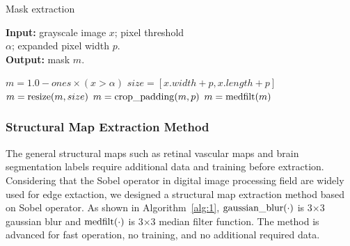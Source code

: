 \documentclass[runningheads]{llncs}
\begin{document}
	\vspace{-0.5cm}\begin{algorithm}[th]
		\caption{Mask extraction}
		\label{alg:2}
		\begin{multicols}{2}
			\hspace*{0.02in} {\bf Input: }grayscale image $x$; pixel threshold \\\hspace*{0.05in}$\alpha$; expanded pixel width $p$.\\
			\hspace*{0.02in} {\bf Output: }mask $m$.
			\begin{algorithmic}[1]
				\State $m = 1.0 - ones \times (x > \alpha)$
				\State $size=[x.width+p, x.length+p]$
				\State $m = {\rm resize}(m, size)$
				\State $m = {\rm crop\_padding}(m,p)$
				\State $m = {\rm medfilt}(m)$
			\end{algorithmic} 
		\end{multicols}
		\vspace{-0.3cm}
	\end{algorithm}\vspace{-0.75cm}
	\subsubsection{Structural Map Extraction Method}
	The general structural maps such as retinal vascular maps\cite{41costa2017towards} and brain segmentation labels \cite{4shin2018medical} require additional data and training before extraction. Considering that the Sobel operator\cite{147Sobel} in digital image processing field are widely used for edge extaction, we designed a structural map extraction method based on Sobel operator. As shown in Algorithm~\ref{alg:1}, ${\rm gaussian\_blur}(\cdot)$ is 3$\times$3 gaussian blur and ${\rm medfilt}(\cdot)$ is 3$\times$3 median filter function. The method is advanced for fast operation, no training, and no additional required data. 
\end{document}
